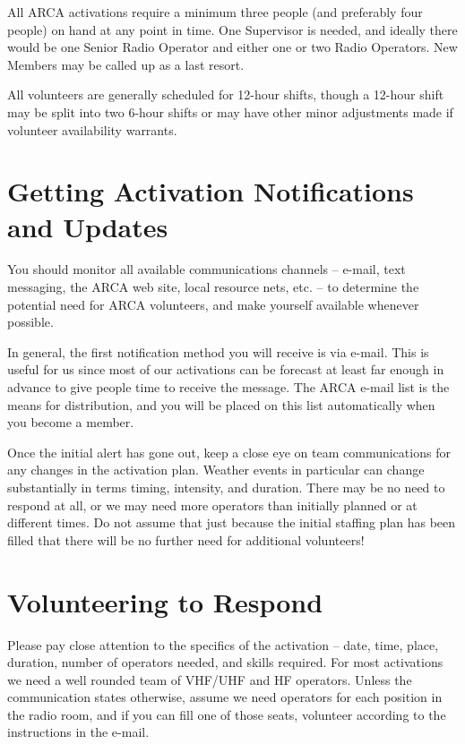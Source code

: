\documentclass[pdflatex,letterpaper,twoside,12pt]{book}
\begin{document}
All ARCA activations require a minimum three people (and preferably four people) on hand at any point in time.  One Supervisor is needed, and ideally there would be one Senior Radio Operator and either one or two Radio Operators.  New Members may be called up as a last resort.

All volunteers are generally scheduled for 12-hour shifts, though a 12-hour shift may be split into two 6-hour shifts or may have other minor adjustments made if volunteer availability warrants.


\section{Getting Activation Notifications and Updates}

You should monitor all available communications channels – e-mail, text messaging, the ARCA web site, local resource nets, etc. – to determine the potential need for ARCA volunteers, and make yourself available whenever possible.

In general, the first notification method you will receive is via e-mail.  This is useful for us since most of our activations can be forecast at least far enough in advance to give people time to receive the message.  The ARCA e-mail list is the means for distribution, and you will be placed on this list automatically when you become a member.

Once the initial alert has gone out, keep a close eye on team communications for any changes in the activation plan.  Weather events in particular can change substantially in terms timing, intensity, and duration.  There may be no need to respond at all, or we may need more operators than initially planned or at different times.  Do not assume that just because the initial staffing plan has been filled that there will be no further need for additional volunteers!


\section{Volunteering to Respond}

Please pay close attention to the specifics of the activation – date, time, place, duration, number of operators needed, and skills required.  For most activations we need a well rounded team of VHF/UHF and HF operators.  Unless the communication states otherwise, assume we need operators for each position in the radio room, and if you can fill one of those seats, volunteer according to the instructions in the e-mail.
\end{document}
